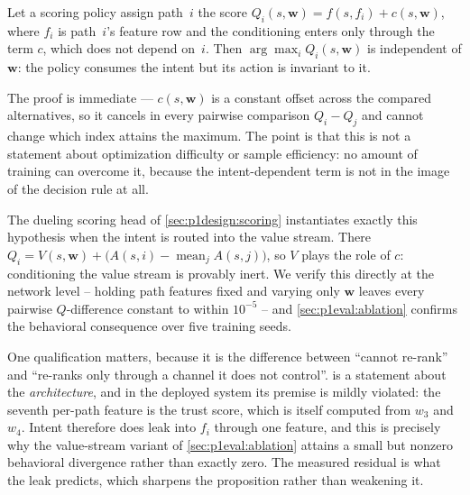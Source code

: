 \begin{proposition}
\label{prop:p1cancel}
Let a scoring policy assign path~$i$ the score
$Q_i(s, \mathbf{w}) = f(s, f_i) + c(s, \mathbf{w})$, where $f_i$ is path~$i$'s feature row and the
conditioning enters only through the term $c$, which does not depend on~$i$. Then
$\arg\max_i Q_i(s,\mathbf{w})$ is independent of $\mathbf{w}$: the policy consumes the intent but its
action is invariant to it.
\end{proposition}

\noindent The proof is immediate --- $c(s,\mathbf{w})$ is a constant offset across the compared
alternatives, so it cancels in every pairwise comparison $Q_i - Q_j$ and cannot change which index
attains the maximum. The point is that this is not a statement about optimization difficulty or sample
efficiency: no amount of training can overcome it, because the intent-dependent term is not in the image
of the decision rule at all.

The dueling scoring head of \cref{sec:p1design:scoring} instantiates exactly this hypothesis when the
intent is routed into the value stream. There $Q_i = V(s, \mathbf{w}) + \big(A(s,i) -
\operatorname{mean}_j A(s,j)\big)$, so $V$ plays the role of $c$: conditioning the value stream is
provably inert. We verify this directly at the network level -- holding path features fixed and varying
only $\mathbf{w}$ leaves every pairwise $Q$-difference constant to within $10^{-5}$ -- and
\cref{sec:p1eval:ablation} confirms the behavioral consequence over five training seeds.

One qualification matters, because it is the difference between ``cannot re-rank'' and ``re-ranks only
through a channel it does not control''.  is a statement about the
\emph{architecture}, and in the deployed system its premise is mildly violated: the seventh per-path
feature is the trust score, which is itself computed from $w_3$ and $w_4$. Intent therefore does leak
into $f_i$ through one feature, and this is precisely why the value-stream variant of
\cref{sec:p1eval:ablation} attains a small but nonzero behavioral divergence rather than exactly zero.
The measured residual is what the leak predicts, which sharpens the proposition rather than weakening
it.

